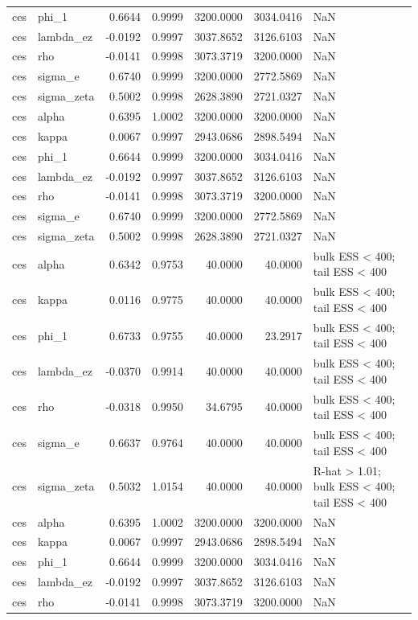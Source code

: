 \begin{tabular}{llrrrrl}
ces & phi\_1 & 0.6644 & 0.9999 & 3200.0000 & 3034.0416 & NaN \\
ces & lambda\_ez & -0.0192 & 0.9997 & 3037.8652 & 3126.6103 & NaN \\
ces & rho & -0.0141 & 0.9998 & 3073.3719 & 3200.0000 & NaN \\
ces & sigma\_e & 0.6740 & 0.9999 & 3200.0000 & 2772.5869 & NaN \\
ces & sigma\_zeta & 0.5002 & 0.9998 & 2628.3890 & 2721.0327 & NaN \\
ces & alpha & 0.6395 & 1.0002 & 3200.0000 & 3200.0000 & NaN \\
ces & kappa & 0.0067 & 0.9997 & 2943.0686 & 2898.5494 & NaN \\
ces & phi\_1 & 0.6644 & 0.9999 & 3200.0000 & 3034.0416 & NaN \\
ces & lambda\_ez & -0.0192 & 0.9997 & 3037.8652 & 3126.6103 & NaN \\
ces & rho & -0.0141 & 0.9998 & 3073.3719 & 3200.0000 & NaN \\
ces & sigma\_e & 0.6740 & 0.9999 & 3200.0000 & 2772.5869 & NaN \\
ces & sigma\_zeta & 0.5002 & 0.9998 & 2628.3890 & 2721.0327 & NaN \\
ces & alpha & 0.6342 & 0.9753 & 40.0000 & 40.0000 & bulk ESS < 400; tail ESS < 400 \\
ces & kappa & 0.0116 & 0.9775 & 40.0000 & 40.0000 & bulk ESS < 400; tail ESS < 400 \\
ces & phi\_1 & 0.6733 & 0.9755 & 40.0000 & 23.2917 & bulk ESS < 400; tail ESS < 400 \\
ces & lambda\_ez & -0.0370 & 0.9914 & 40.0000 & 40.0000 & bulk ESS < 400; tail ESS < 400 \\
ces & rho & -0.0318 & 0.9950 & 34.6795 & 40.0000 & bulk ESS < 400; tail ESS < 400 \\
ces & sigma\_e & 0.6637 & 0.9764 & 40.0000 & 40.0000 & bulk ESS < 400; tail ESS < 400 \\
ces & sigma\_zeta & 0.5032 & 1.0154 & 40.0000 & 40.0000 & R-hat > 1.01; bulk ESS < 400; tail ESS < 400 \\
ces & alpha & 0.6395 & 1.0002 & 3200.0000 & 3200.0000 & NaN \\
ces & kappa & 0.0067 & 0.9997 & 2943.0686 & 2898.5494 & NaN \\
ces & phi\_1 & 0.6644 & 0.9999 & 3200.0000 & 3034.0416 & NaN \\
ces & lambda\_ez & -0.0192 & 0.9997 & 3037.8652 & 3126.6103 & NaN \\
ces & rho & -0.0141 & 0.9998 & 3073.3719 & 3200.0000 & NaN \\

\end{tabular}
